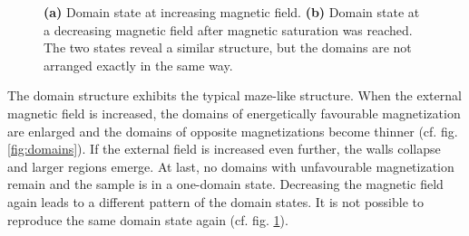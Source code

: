 \documentclass[a4paper]{scrartcl}
\numberwithin{equation}{section}
\numberwithin{figure}{section}
\numberwithin{table}{section}
\begin{document}
\begin{figure} 
 \centering
{} \hfill
{} 
\caption{ \small \textbf{(a)} Domain state at increasing magnetic field. \textbf{(b)} Domain state at a decreasing magnetic field after magnetic saturation was reached. The two states reveal a similar structure, but the domains are not arranged exactly in the same way.
  } 
	\label{fig:reaufbau}
\end{figure}






The domain structure exhibits the typical maze-like structure. When the external magnetic field is increased, the domains of energetically favourable magnetization are enlarged and the domains of opposite magnetizations become thinner (cf. fig. \ref{fig:domains}). If the external field is increased even further, the walls collapse and larger regions emerge. At last, no domains with unfavourable magnetization remain and the sample is in a one-domain state. Decreasing the magnetic field again leads to a different pattern of the domain states. It is not possible to reproduce the same domain state again (cf. fig. \ref{fig:reaufbau}).
\end{document}
